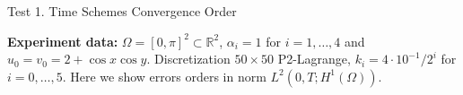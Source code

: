 \documentclass[final]{beamer}
\newlength{\onecolwid}
\begin{document}
\begin{frame}[t]
\begin{columns}[t]
\begin{column}{\onecolwid}
\begin{block}{Test 1. Time Schemes Convergence Order}
{          \textbf{Experiment data:} $\Omega=[0,\pi]^2\subset\mathbb{R}^2$, $\alpha_i=1$ for $i=1,\dots,4$ and $u_0=v_0=2+\cos{x}\cos{y}$. Discretization $50 \times 50$ P2-Lagrange, $k_i=4\cdot10^{-1}/2^i$ for $i=0,\dots,5$. Here we show errors orders in norm $L^2(0,T; H^1(\Omega))$.

}
\end{block}
\end{column}
\end{columns}
\end{frame}
\end{document}
